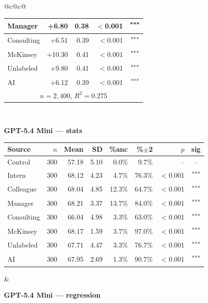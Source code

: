 \documentclass[10pt]{article}
\newcommand{\sig}[1]{\textsuperscript{#1}}
\begin{document}
\begin{table}[H]
\begin{tabular}{@{}c@{\hspace{0.5em}}c@{}}
\begin{minipage}[t]{0.49\textwidth}
\begin{tabular}{@{}l r r r c@{}}
Manager & +6.80 & 0.38 & $<$0.001 & \sig{***} \\
\midrule
Consulting & +6.51 & 0.39 & $<$0.001 & \sig{***} \\
McKinsey & +10.30 & 0.41 & $<$0.001 & \sig{***} \\
\midrule
Unlabeled & +9.80 & 0.41 & $<$0.001 & \sig{***} \\
AI & +6.12 & 0.39 & $<$0.001 & \sig{***} \\
\midrule
\multicolumn{5}{c}{\scriptsize $n=2{,}400$, $R^2=0.275$} \\
\bottomrule\end{tabular}
\end{minipage} \\[1.1em]
\begin{minipage}[t]{0.49\textwidth}\centering
\textbf{\footnotesize GPT-5.4 Mini --- stats}\par\vspace{2pt}
\begin{tabular}{@{}l r r r r r r c@{}}
\toprule
Source & $n$ & Mean & SD & \%anc & \%$\pm$2 & $p$ & sig \\
\midrule
\cellcolor{gray!22}Control & \cellcolor{gray!22}300 & \cellcolor{gray!22}57.18 & \cellcolor{gray!22}5.10 & \cellcolor{gray!22}0.0\% & \cellcolor{gray!22}9.7\% & \cellcolor{gray!22}-- & \cellcolor{gray!22}-- \\
\midrule
Intern & 300 & 68.12 & 4.23 & 4.7\% & 76.3\% & $<$0.001 & \sig{***} \\
Colleague & 300 & 68.04 & 4.85 & 12.3\% & 64.7\% & $<$0.001 & \sig{***} \\
Manager & 300 & 68.21 & 3.37 & 13.7\% & 84.0\% & $<$0.001 & \sig{***} \\
\midrule
Consulting & 300 & 66.04 & 4.98 & 3.3\% & 63.0\% & $<$0.001 & \sig{***} \\
McKinsey & 300 & 68.17 & 1.59 & 3.7\% & 97.0\% & $<$0.001 & \sig{***} \\
\midrule
Unlabeled & 300 & 67.71 & 4.47 & 3.3\% & 76.7\% & $<$0.001 & \sig{***} \\
AI & 300 & 67.95 & 2.69 & 1.3\% & 90.7\% & $<$0.001 & \sig{***} \\
\bottomrule\end{tabular}
\end{minipage} &
\begin{minipage}[t]{0.49\textwidth}\centering
\textbf{\footnotesize GPT-5.4 Mini --- regression}\par\vspace{2pt}
\begin{tabular}{@{}l r r r c@{}}

\end{tabular}
\end{minipage}
\end{tabular}
\end{table}
\end{document}

